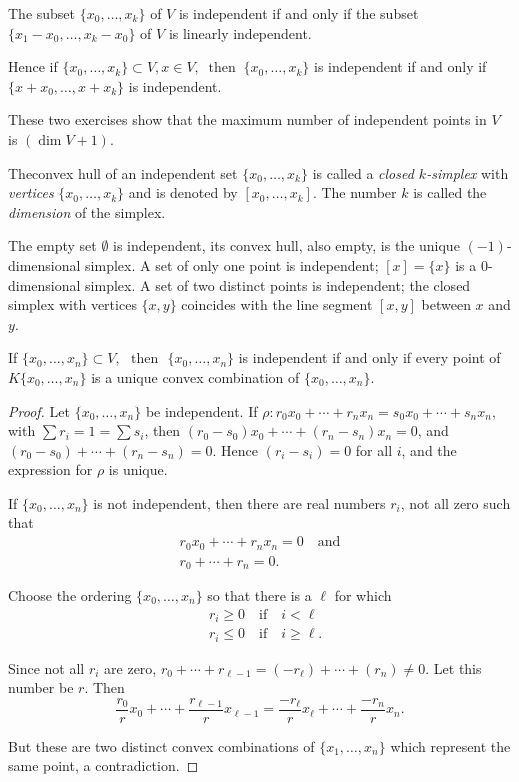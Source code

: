 \begin{ex}\label{chap1-ex1.2.5}
The subset $\{x_{0},\ldots,x_{k}\}$ of $V$ is independent if and only if the subset $\{x_{1}-x_{0},\ldots,x_{k}-x_{0}\}$ of $V$ is linearly independent.
\end{ex}

Hence if $\{x_{0},\ldots,x_{k}\}\subset V, x\in V, ~\text{ then }~ \{x_{0},\ldots,x_{k}\}$ is independent if and only if $\{x+x_{0},\ldots,x+x_{k}\}$ is independent.

These two exercises show that the maximum number of independent points in $V$ is $(\dim V+1)$.

The\pageoriginale convex hull of an independent set $\{x_{0},\ldots,x_{k}\}$ is called a {\em closed $k$-simplex} with {\em vertices} $\{x_{0},\ldots,x_{k}\}$ and is denoted by $[x_{0},\ldots,x_{k}]$. The number $k$ is called the {\em dimension} of the simplex.

The empty set $\emptyset$ is independent, its convex hull, also empty, is the unique $(-1)$-dimensional simplex. A set of only one point is independent; $[x]=\{x\}$ is a $0$-dimensional simplex. A set of two distinct points is independent; the closed simplex with vertices $\{x,y\}$ coincides with the line segment $[x,y]$ between $x$ and $y$.

\begin{proposition}\label{chap1-prop1.2.6}
If $\{x_{0},\ldots,x_{n}\}\subset V,\text{~ then~ } \{x_{0},\ldots,x_{n}\}$ is independent if and only if every point of $K\{x_{0},\ldots,x_{n}\}$ is a unique convex combination of $\{x_{0},\ldots,x_{n}\}$.
\end{proposition}

\begin{proof}
Let $\{x_{0},\ldots,x_{n}\}$ be independent. If $\rho:r_{0}x_{0}+\cdots+r_{n}x_{n}=s_{0}x_{0}+\cdots+s_{n}x_{n}$, with $\sum r_{i}=1=\sum s_{i}$, then $(r_{0}-s_{0})x_{0}+\cdots+(r_{n}-s_{n})x_{n}=0$, and $(r_{0}-s_{0})+\cdots+(r_{n}-s_{n})=0$. Hence $(r_{i}-s_{i})=0$ for all $i$, and the expression for $\rho$ is unique.

If $\{x_{0},\ldots,x_{n}\}$ is not independent, then there are real numbers $r_{i}$, not all zero such that
\begin{gather*}
r_{0}x_{0}+\cdots+r_{n}x_{n}=0\quad\text{and}\\
r_{0}+\cdots+r_{n}=0.
\end{gather*}

Choose the ordering $\{x_{0},\ldots,x_{n}\}$ so that there is a $\ell$ for which  
\begin{align*}
& r_{i}\geq 0\quad\text{if}\quad i<\ell\\
& r_{i}\leq 0\quad\text{if}\quad i\geq \ell.
\end{align*}\pageoriginale

Since not all $r_{i}$ are zero, $r_{0}+\cdots+r_{\ell-1}=(-r_{\ell})+\cdots+(r_{n})\neq 0$. Let this number be $r$. Then
$$
\frac{r_{0}}{r}x_{0}+\cdots+\frac{r_{\ell-1}}{r}x_{\ell-1}=\frac{-r_{\ell}}{r}x_{\ell}+\cdots+\frac{-r_{n}}{r}x_{n}. 
$$

But these are two distinct convex combinations of $\{x_{1},\ldots,x_{n}\}$ which represent the same point, a contradiction.
\end{proof}

